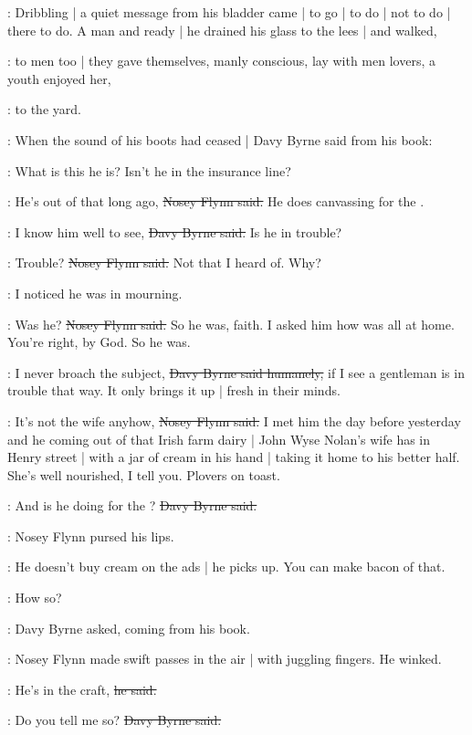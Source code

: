 :
Dribbling |
a quiet message from his bladder came |
to go |
to do |
not to do |
there to do.
A man and ready |
he drained his glass to the lees |
and walked,

\BloomInt:
to men too |
they gave themselves,
manly conscious,
lay with men lovers,
a youth enjoyed her,

:
to the yard.

:
When the sound of his boots had ceased |
Davy Byrne said from his book:

\davybyrne:
What is this he is?
Isn't he in the insurance line?

\nosey:
He's out of that long ago,
\sout{Nosey Flynn said.}
He does canvassing for the .

\davybyrne:
I know him well to see,
\sout{Davy Byrne said.}
Is he in trouble?

\nosey:
Trouble?
\sout{Nosey Flynn said.}
Not that I heard of.
Why?

\davybyrne:
I noticed he was in mourning.

\nosey:
Was he?
\sout{Nosey Flynn said.}
So he was, faith.
I asked him how was all at home.
You're right, by God.
So he was.

\davybyrne:
I never broach the subject,
\sout{Davy Byrne said humanely,}
if I see a gentleman is in trouble that way.
It only brings it up |
fresh in their minds.

\nosey:
It's not the wife anyhow,
\sout{Nosey Flynn said.}
I met him the day before yesterday
and he coming out of that Irish farm dairy |
John Wyse Nolan's wife has in Henry street |
with a jar of cream in his hand |
taking it home to his better half.
She's well nourished, I tell you.
Plovers on toast.

\davybyrne:
And is he doing for the ?
\sout{Davy Byrne said.}

:
Nosey Flynn pursed his lips.

\nosey:
He doesn't buy cream on the ads |
he picks up.
You can make bacon of that.

\davybyrne:
How so?

:
Davy Byrne asked,
coming from his book.

:
Nosey Flynn made swift passes in the air |
with juggling fingers.
He winked.

\nosey:
He's in the craft,
\sout{he said.}

\davybyrne:
Do you tell me so?
\sout{Davy Byrne said.}

